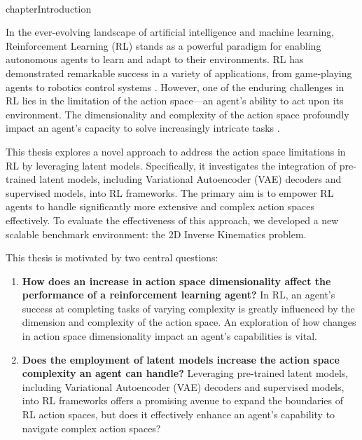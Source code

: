 \\chapter{Introduction}\label{chap:introduction}




In the ever-evolving landscape of artificial intelligence and machine learning, Reinforcement Learning (RL) stands as a powerful paradigm for enabling autonomous agents to learn and adapt to their environments. RL has demonstrated remarkable success in a variety of applications, from game-playing agents \cite{SAC_VideoGames_Paper} to robotics control systems \cite{SAC_Applications_Paper} \cite{anymal_RL}. However, one of the enduring challenges in RL lies in the limitation of the action space—an agent's ability to act upon its environment. The dimensionality and complexity of the action space profoundly impact an agent's capacity to solve increasingly intricate tasks \cite{RL_Complex_Action_Spaces}.

This thesis explores a novel approach to address the action space limitations in RL by leveraging latent models. Specifically, it investigates the integration of pre-trained latent models, including Variational Autoencoder (VAE) decoders and supervised models, into RL frameworks. The primary aim is to empower RL agents to handle significantly more extensive and complex action spaces effectively. To evaluate the effectiveness of this approach, we developed a new scalable benchmark environment: the 2D Inverse Kinematics problem.

This thesis is motivated by two central questions:

\begin{enumerate}
    \item \textbf{How does an increase in action space dimensionality affect the performance of a reinforcement learning agent?} In RL, an agent's success at completing tasks of varying complexity is greatly influenced by the dimension and complexity of the action space. An exploration of how changes in action space dimensionality impact an agent's capabilities is vital. 
    \item \textbf{Does the employment of latent models increase the action space complexity an agent can handle?} Leveraging pre-trained latent models, including Variational Autoencoder (VAE) decoders and supervised models, into RL frameworks offers a promising avenue to expand the boundaries of RL action spaces, but does it effectively enhance an agent's capability to navigate complex action spaces?
\end{enumerate}


